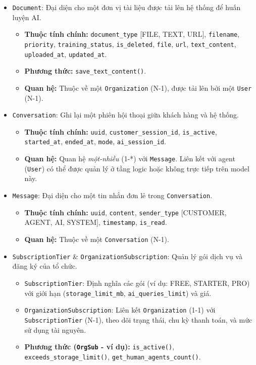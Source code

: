 \begin{itemize}[leftmargin=*, labelsep=4mm]
    \item \texttt{Document}: Đại diện cho một đơn vị tài liệu được tải lên hệ thống để huấn luyện AI.
        \begin{itemize}
            \item \textbf{Thuộc tính chính:} \texttt{document\_type} [FILE, TEXT, URL], \texttt{filename}, \texttt{priority}, \texttt{training\_status}, \texttt{is\_deleted}, \texttt{file}, \texttt{url}, \texttt{text\_content}, \texttt{uploaded\_at}, \texttt{updated\_at}. %
            \item \textbf{Phương thức:} \texttt{save\_text\_content()}.
            \item \textbf{Quan hệ:} Thuộc về một \texttt{Organization} (N-1), được tải lên bởi một \texttt{User} (N-1).
        \end{itemize}

    \item \texttt{Conversation}: Ghi lại một phiên hội thoại giữa khách hàng và hệ thống.
        \begin{itemize}
            \item \textbf{Thuộc tính chính:} \texttt{uuid}, \texttt{customer\_session\_id}, \texttt{is\_active}, \texttt{started\_at}, \texttt{ended\_at}, \texttt{mode}, \texttt{ai\_session\_id}. %
            \item \textbf{Quan hệ:} Quan hệ \textit{một-nhiều} (1-*) với \texttt{Message}. Liên kết với agent (\texttt{User}) có thể được quản lý ở tầng logic hoặc không trực tiếp trên model này.
        \end{itemize}

    \item \texttt{Message}: Đại diện cho một tin nhắn đơn lẻ trong \texttt{Conversation}.
        \begin{itemize}
            \item \textbf{Thuộc tính chính:} \texttt{uuid}, \texttt{content}, \texttt{sender\_type} [CUSTOMER, AGENT, AI, SYSTEM], \texttt{timestamp}, \texttt{is\_read}.
            \item \textbf{Quan hệ:} Thuộc về một \texttt{Conversation} (N-1).
        \end{itemize}

    \item \texttt{SubscriptionTier} \& \texttt{OrganizationSubscription}: Quản lý gói dịch vụ và đăng ký của tổ chức.
        \begin{itemize}
            \item \texttt{SubscriptionTier}: Định nghĩa các gói (ví dụ: FREE, STARTER, PRO) với giới hạn (\texttt{storage\_limit\_mb}, \texttt{ai\_queries\_limit}) và giá.
            \item \texttt{OrganizationSubscription}: Liên kết \texttt{Organization} (1-1) với \texttt{SubscriptionTier} (N-1), theo dõi trạng thái, chu kỳ thanh toán, và mức sử dụng tài nguyên.
            \item \textbf{Phương thức (\texttt{OrgSub} - ví dụ):} \texttt{is\_active()}, \texttt{exceeds\_storage\_limit()}, \texttt{get\_human\_agents\_count()}.
        \end{itemize}


\end{itemize}
